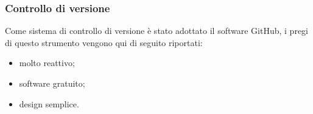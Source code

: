 		\subsubsection{Controllo di versione}
			Come sistema di controllo di versione è stato adottato il software GitHub, i pregi di questo strumento vengono qui di seguito riportati:
			\begin{itemize}
				\item molto reattivo;
				\item software gratuito;
				\item design semplice.
			\end{itemize}